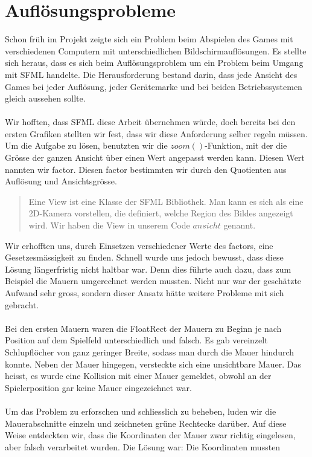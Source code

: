 \documentclass[11pt,a4paper]{scrbook}
\begin{document}
\section{Auflösungsprobleme}     
\label{aufloesungsprobleme}
Schon früh im Projekt zeigte sich ein Problem beim Abspielen des Games mit verschiedenen Computern mit unterschiedlichen Bildschirmauflösungen. Es stellte sich heraus, dass es sich
beim Auflösungsproblem um ein Problem beim Umgang mit SFML handelte.
Die Herausforderung bestand darin, dass jede Ansicht des Games bei jeder Auflösung, jeder Gerätemarke und bei beiden Betriebssystemen gleich aussehen sollte.\\
\\
Wir hofften, dass SFML diese Arbeit übernehmen würde, doch bereits bei den ersten Grafiken stellten wir fest, dass wir diese Anforderung selber regeln müssen.
Um die Aufgabe zu lösen, benutzten wir die $zoom()$-Funktion, mit der die Grösse der ganzen Ansicht über einen Wert angepasst werden kann.
Diesen Wert nannten wir factor.
Diesen factor bestimmten wir durch den Quotienten aus Auflösung und Ansichtsgrösse.
\begin{quote}
Eine View ist eine Klasse der SFML Bibliothek.
Man kann es sich als eine 2D-Kamera vorstellen, die definiert, welche Region des Bildes angezeigt wird.
Wir haben die View in unserem Code $ansicht$ genannt.
\end{quote}
Wir erhofften uns, durch Einsetzen verschiedener Werte des factors, eine Gesetzesmässigkeit zu finden.
Schnell wurde uns jedoch bewusst, dass diese Lösung längerfristig nicht haltbar war. 
Denn dies führte auch dazu, dass zum Beispiel die Mauern umgerechnet werden mussten.
Nicht nur war der geschätzte Aufwand sehr gross, sondern dieser Ansatz hätte weitere Probleme mit sich gebracht.\\
\\
\label{mauern}
Bei den ersten Mauern waren die FloatRect der Mauern zu Beginn je nach Position auf dem Spielfeld unterschiedlich und falsch.
Es gab vereinzelt Schlupflöcher von ganz geringer Breite, sodass man durch die Mauer hindurch konnte. 
Neben der Mauer hingegen, versteckte sich eine unsichtbare Mauer. 
Das heisst, es wurde eine Kollision mit einer Mauer gemeldet, obwohl an der Spielerposition gar keine Mauer eingezeichnet war.\\
\\
Um das Problem zu erforschen und schliesslich zu beheben, luden
wir die Mauerabschnitte einzeln und zeichneten grüne Rechtecke darüber. 
Auf diese Weise entdeckten wir, dass die Koordinaten der Mauer zwar richtig eingelesen, aber falsch verarbeitet wurden. Die Lösung war: Die Koordinaten mussten
\end{document}
